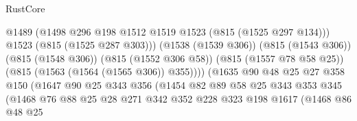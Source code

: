 \begin{lexlean}{RustCore}
\begin{coremodule}
                                          @1489
                                          (@1498
                                            @296
                                            @198
                                            @1512
                                            @1519
                                            @1523
                                            (@815 (@1525 @297 @134)))
                                          @1523
                                          (@815 (@1525 @287 @303)))
                                        (@1538 (@1539 @306))
                                        (@815 (@1543 @306))
                                        (@815 (@1548 @306))
                                        (@815 (@1552 @306 @58))
                                        (@815 (@1557 @78 @58 @25))
                                        (@815 (@1563 (@1564 (@1565 @306)) @355))))
                                    (@1635
                                      @90
                                      @48
                                      @25
                                      @27
                                      @358
                                      @150
                                      (@1647
                                        @90
                                        @25
                                        @343
                                        @356
                                        (@1454
                                          @82
                                          @89
                                          @58
                                          @25
                                          @343
                                          @353
                                          @345
                                          (@1468
                                            @76
                                            @88
                                            @25
                                            @28
                                            @271
                                            @342
                                            @352
                                            @228
                                            @323
                                            @198
                                            @1617
                                            (@1468
                                              @86
                                              @48
                                              @25

\end{coremodule}
\end{lexlean}
